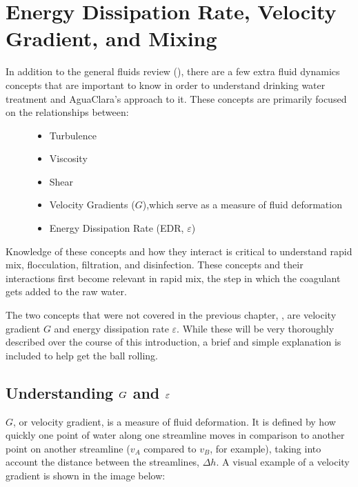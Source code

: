 \documentclass[letterpaper,10pt,english]{sphinxmanual}
\begin{document}
\section{Energy Dissipation Rate, Velocity Gradient, and Mixing}
\label{\detokenize{Rapid_Mix/RM_Intro:energy-dissipation-rate-velocity-gradient-and-mixing}}\label{\detokenize{Rapid_Mix/RM_Intro:heading-edr-g-and-mixing}}\begin{description}
\item[{In addition to the general fluids review ({\hyperref[\detokenize{Review/Review_Fluid_Mechanics:title-review-fluid-mechanics}]{}}), there are a few extra fluid dynamics concepts that are important to know in order to understand drinking water treatment and AguaClara’s approach to it. These concepts are primarily focused on the relationships between:}] \leavevmode\begin{itemize}
\item {} 
Turbulence

\item {} 
Viscosity

\item {} 
Shear

\item {} 
Velocity Gradients (\(G\)),which serve as a measure of fluid deformation

\item {} 
Energy Dissipation Rate (EDR, \(\varepsilon\))

\end{itemize}

\end{description}

Knowledge of these concepts and how they interact is critical to understand rapid mix, flocculation, filtration, and disinfection. These concepts and their interactions first become relevant in rapid mix, the step in which the coagulant gets added to the raw water.

The two concepts that were not covered in the previous chapter, {\hyperref[\detokenize{Review/Review_Fluid_Mechanics:title-review-fluid-mechanics}]{}}, are velocity gradient \(G\) and energy dissipation rate \(\varepsilon\). While these will be very thoroughly described over the course of this introduction, a brief and simple explanation is included to help get the ball rolling.


\subsection{Understanding \protect\(G\protect\) and \protect\(\varepsilon\protect\)}
\label{\detokenize{Rapid_Mix/RM_Intro:understanding-and}}
\(G\), or velocity gradient, is a measure of fluid deformation. It is defined by how quickly one point of water along one streamline moves in comparison to another point on another streamline (\(v_A\) compared to \(v_B\), for example), taking into account the distance between the streamlines, \(\Delta h\). A visual example of a velocity gradient is shown in the image below:
\end{document}

